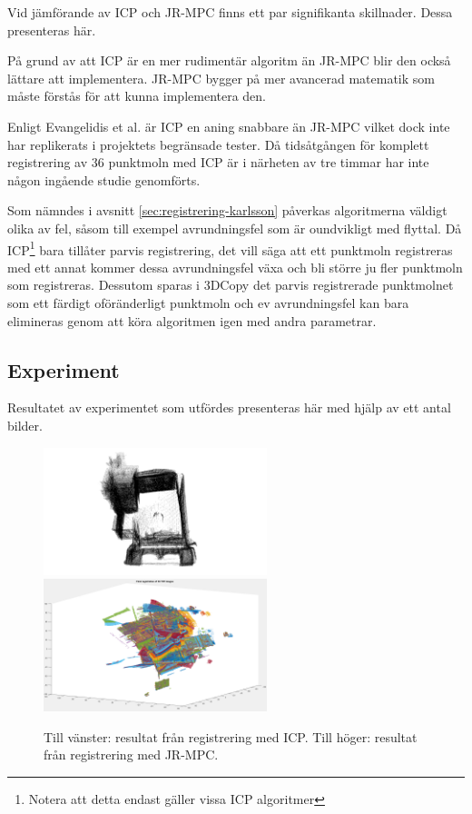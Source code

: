 Vid jämförande av ICP och JR-MPC finns ett par signifikanta skillnader. Dessa presenteras här.

På grund av att ICP är en mer rudimentär algoritm än JR-MPC blir den också lättare att implementera. JR-MPC bygger på mer avancerad matematik som måste förstås för att kunna implementera den.

Enligt Evangelidis et al. \cite{Evangelidis-ECCV-2014} är ICP en aning snabbare än JR-MPC vilket dock inte har replikerats i projektets begränsade tester. Då tidsåtgången för komplett registrering av 36 punktmoln med ICP är i närheten av tre timmar har inte någon ingående studie genomförts. 

Som nämndes i avsnitt \ref{sec:registrering-karlsson} påverkas algoritmerna väldigt olika av fel, såsom till exempel avrundningsfel som är oundvikligt med flyttal. Då ICP\footnote{Notera att detta endast gäller vissa ICP algoritmer} bara tillåter parvis registrering, det vill säga att ett punktmoln registreras med ett annat kommer dessa avrundningsfel växa och bli större ju fler punktmoln som registreras. Dessutom sparas i 3DCopy det parvis registrerade punktmolnet som ett färdigt oföränderligt punktmoln och ev avrundningsfel kan bara elimineras genom att köra algoritmen igen med andra parametrar.

\subsection{Experiment}

Resultatet av experimentet som utfördes presenteras här med hjälp av ett antal bilder.  

\begin{figure}[H]
	\centering
	\includegraphics[width=65mm]{figures/first_registered_church.png}
	\includegraphics[width=65mm]{figures/JRMPC_result.png}
	\caption{Till vänster: resultat från registrering med ICP. Till höger: resultat från registrering med JR-MPC.}
	\label{fig:icp_vs_jrmpc_result}
\end{figure}

